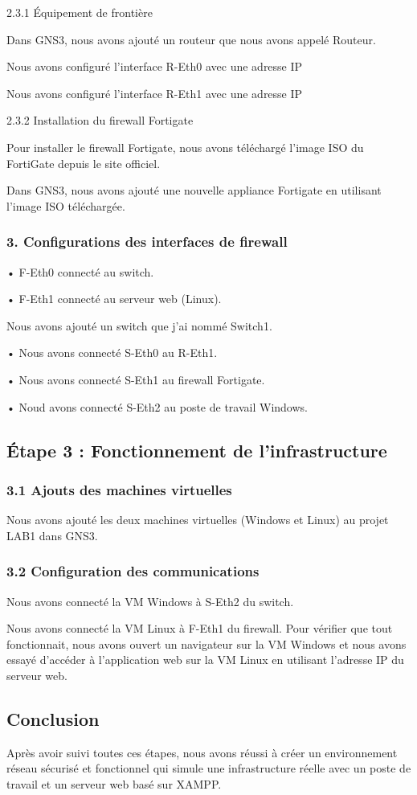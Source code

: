 \documentclass[12pt,a4paper]{report}
\begin{document}
	2.3.1 Équipement de frontière
	
	Dans GNS3, nous avons ajouté un routeur que nous avons appelé Routeur.
	
		Nous avons configuré l'interface R-Eth0 avec une adresse IP 
	
		Nous avons configuré l'interface R-Eth1 avec une adresse IP 
	
	2.3.2 Installation du firewall Fortigate
	
		Pour installer le firewall Fortigate, nous avons téléchargé l'image ISO du FortiGate depuis le site officiel.
		
		Dans GNS3, nous avons ajouté une nouvelle appliance Fortigate en utilisant l'image ISO téléchargée.
	
\subsubsection{3. Configurations des interfaces de firewall}	
	
	• F-Eth0 connecté au switch.
	
	• F-Eth1 connecté au serveur web (Linux).
	

		Nous avons ajouté un switch que j'ai nommé Switch1.
	
	• Nous avons connecté S-Eth0 au R-Eth1.
	
	• Nous avons connecté S-Eth1 au firewall
 Fortigate.
 
	• Noud avons  connecté S-Eth2 au poste de travail Windows.
	
\subsection{Étape 3 : Fonctionnement de l'infrastructure}	
	
\subsubsection{3.1 Ajouts des machines virtuelles}
	
	Nous avons ajouté les deux machines virtuelles (Windows et Linux) au projet LAB1 dans GNS3.
	
\subsubsection{3.2 Configuration des communications}	
	
		Nous avons connecté la VM Windows à S-Eth2 du switch.
		
		Nous avons connecté la VM Linux à F-Eth1 du firewall.
		Pour vérifier que tout fonctionnait, nous avons ouvert un navigateur sur la VM Windows et nous avons essayé d'accéder à l'application web sur la VM Linux en utilisant l'adresse IP du serveur web.
	
	
	
\subsection{Conclusion}
	
	Après avoir suivi toutes ces étapes, nous avons réussi à créer un environnement réseau sécurisé et fonctionnel qui simule une infrastructure réelle avec un poste de travail et un serveur web basé sur XAMPP. 
	
	
\end{document}
